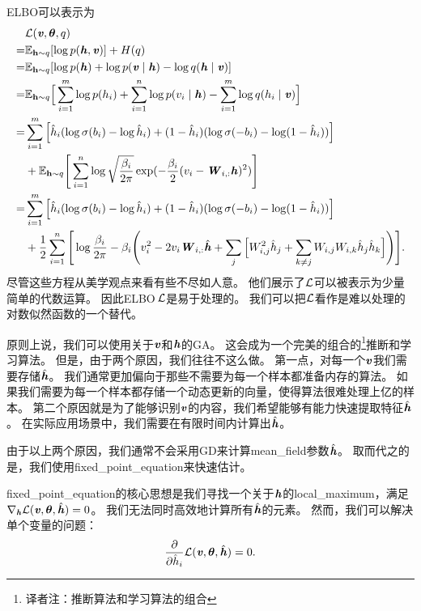 \gls{ELBO}可以表示为
\begin{align}
& \mathcal{L}(\boldsymbol{\mathit{v}},\boldsymbol{\theta},q)\\
 = & \mathbb{E}_{\mathbf{h}\sim q}[\log p(\boldsymbol{\mathit{h}},\boldsymbol{\mathit{v}})] + H(q)\\
 = & \mathbb{E}_{\mathbf{h}\sim q}[\log p(\boldsymbol{\mathit{h}}) + \log p(\boldsymbol{\mathit{v}}\mid\boldsymbol{\mathit{h}}) - \log q(\boldsymbol{\mathit{h}}\mid\boldsymbol{\mathit{v}})]\\
= & \mathbb{E}_{\mathbf{h}\sim q}\Big[\sum_{i=1}^{m}\log p(h_i) + \sum_{i=1}^{n} \log p(v_i\mid\boldsymbol{\mathit{h}}) - \sum_{i=1}^{m}\log q(h_i\mid\boldsymbol{\mathit{v}})\Big]\\
= &  \sum_{i=1}^{m}\Big[\hat{h}_i(\log \sigma(b_i) - \log \hat{h}_i) + (1 - \hat{h}_i)(\log \sigma(-b_i) - \log (1-\hat{h}_i))\Big] \\
& +  \mathbb{E}_{\mathbf{h}\sim q} \Bigg[ \sum_{i=1}^{n}\log \sqrt{\frac{\beta_i}{2\pi}}\exp(-\frac{\beta_i}{2}(v_i - \boldsymbol{\mathit{W}}_{i,:}\boldsymbol{\mathit{h}})^2)\Bigg] \\
= &  \sum_{i=1}^{m}\Big[\hat{h}_i(\log \sigma(b_i) - \log \hat{h}_i) + (1 - \hat{h}_i)(\log \sigma(-b_i) - \log (1-\hat{h}_i))\Big] \\
& + \frac{1}{2} \sum_{i=1}^{n} \Bigg[ \log {\frac{\beta_i}{2\pi}} - \beta_i \Bigg(v_i^2 - 2 v_i \boldsymbol{\mathit{W}}_{i,:}\hat{\boldsymbol{\mathit{h}}} + \sum_{j}\Big[W^2_{i,j}\hat{h}_j + \sum_{k \neq j}W_{i,j}W_{i,k}\hat{h}_j\hat{h}_k \Big] \Bigg) \Bigg]. 
\label{eqn:1936}
\end{align}
尽管这些方程从美学观点来看有些不尽如人意。
他们展示了$\mathcal{L}$可以被表示为少量简单的代数运算。
因此\gls{ELBO}$\,\mathcal{L}$是易于处理的。
我们可以把$\mathcal{L}$看作是难以处理的对数似然函数的一个替代。


原则上说，我们可以使用关于$\boldsymbol{\mathit{v}}$和$\boldsymbol{\mathit{h}}$的\gls{GA}。
这会成为一个完美的组合的\footnote{译者注：推断算法和学习算法的组合}推断和学习算法。
但是，由于两个原因，我们往往不这么做。
第一点，对每一个$\boldsymbol{\mathit{v}}$我们需要存储$\hat{\boldsymbol{\mathit{h}}}$。
我们通常更加偏向于那些不需要为每一个样本都准备内存的算法。
如果我们需要为每一个样本都存储一个动态更新的向量，使得算法很难处理上亿的样本。
第二个原因就是为了能够识别$\boldsymbol{\mathit{v}}$的内容，我们希望能够有能力快速提取特征$\hat{\boldsymbol{\mathit{h}}}$。
在实际应用场景中，我们需要在有限时间内计算出$\hat{\boldsymbol{\mathit{h}}}$。


由于以上两个原因，我们通常不会采用\gls{GD}来计算\gls{mean_field}参数$\hat{\boldsymbol{\mathit{h}}}$。
取而代之的是，我们使用\gls{fixed_point_equation}来快速估计。


\gls{fixed_point_equation}的核心思想是我们寻找一个关于$\boldsymbol{\mathit{h}}$的\gls{local_maximum}，满足$\nabla_{\boldsymbol{\mathit{h}}}\mathcal{L}(\boldsymbol{\mathit{v}},\boldsymbol{\theta},\hat{\boldsymbol{\mathit{h}}}) = 0$。
我们无法同时高效地计算所有$\hat{\boldsymbol{\mathit{h}}}$的元素。
然而，我们可以解决单个变量的问题：
\begin{align}
\label{eqn:1937}
\frac{\partial}{\partial \hat{h}_i} \mathcal{L}(\boldsymbol{\mathit{v}},\boldsymbol{\theta},\hat{\boldsymbol{\mathit{h}}}) = 0 .
\end{align}


